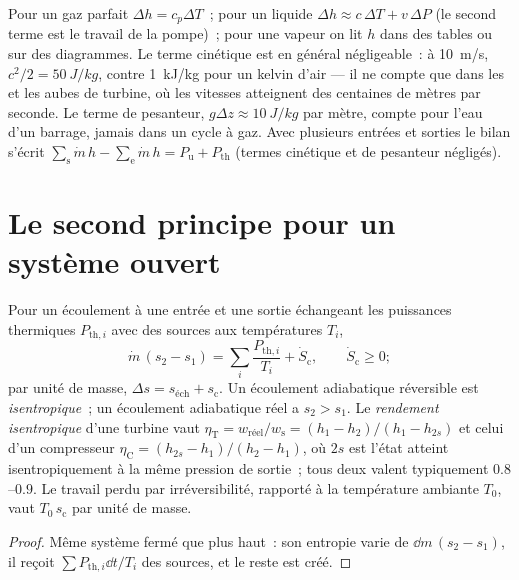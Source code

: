 \begin{remark}\label{rem:b2:open-systems:using}
Pour un gaz parfait $\Delta h = c_p\Delta T$~; pour un liquide $\Delta h \approx
c\,\Delta T + v\,\Delta P$ (le second terme est le travail de la pompe)~; pour une vapeur
on lit $h$ dans des tables ou sur des diagrammes. Le terme cinétique est en général
négligeable~: à \qty{10}{m/s}, $c^2/2 = \qty{50}{J/kg}$, contre
\qty{1}{kJ/kg} pour un kelvin d'air --- il ne compte que dans les  et les
aubes de turbine, où les vitesses atteignent des centaines de mètres par seconde. Le
terme de pesanteur, $g\Delta z \approx \qty{10}{J/kg}$ par mètre, compte pour
l'eau d'un barrage, jamais dans un cycle à gaz. Avec plusieurs entrées et sorties
le bilan s'écrit $\sum_{\text{s}}\dot m\,h - \sum_{\text{e}}\dot m\,h =
P_{\text{u}} + P_{\text{th}}$ (termes cinétique et de pesanteur négligés).
\end{remark}

\section{Le second principe pour un système ouvert}

\begin{theorem}\label{thm:b2:open-systems:secondlaw}
Pour un écoulement  à une entrée et une sortie échangeant les puissances thermiques
$P_{\text{th},i}$ avec des sources aux températures $T_i$,
\[
\dot m\,(s_2 - s_1) = \sum_i\frac{P_{\text{th},i}}{T_i} + \dot S_{\text{c}},
\qquad \dot S_{\text{c}} \ge 0 ;
\]
par unité de masse, $\Delta s = s_{\text{éch}} + s_{\text{c}}$. Un écoulement adiabatique
réversible est \emph{isentropique}~; un écoulement adiabatique réel a $s_2 >
s_1$. Le \emph{rendement isentropique}
d'une turbine vaut $\eta_{\text{T}} = w_{\text{réel}}/w_{\text{s}} = (h_1 - h_2)/(h_1
- h_{2s})$ et celui d'un compresseur $\eta_{\text{C}} = (h_{2s} - h_1)/(h_2 -
h_1)$, où $2s$ est l'état atteint isentropiquement à la même
pression de sortie~; tous deux valent typiquement $0.8$--$0.9$. Le travail perdu par
irréversibilité, rapporté à la température ambiante $T_0$, vaut
$T_0\,s_{\text{c}}$ par unité de masse.
\end{theorem}

\begin{proof}
Même système fermé que plus haut~: son entropie varie de $\dd m\,(s_2 -
s_1)$, il reçoit $\sum P_{\text{th},i}\dd t/T_i$ des sources, et le
reste est créé.
\end{proof}

